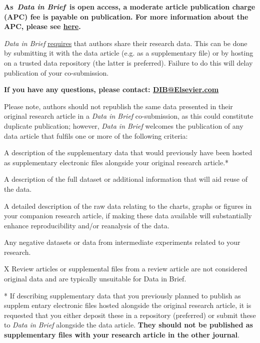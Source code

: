 \documentclass[times,final]{elsarticle.cls}
\begin{document}
\vskip6pt\noindent
\textbf{As~\textit{Data in Brief}~is open access, a moderate article publication charge
(APC) fee is payable on publication. For more information about the
APC, please see 
\href{https://www.elsevier.com/journals/data-in-brief/2352-3409/open-access-journal}%
{here}.}

\vskip6pt\noindent
\textit{Data in Brief} \underline{requires} that authors share their research data. This can
be done by submitting it with the data article (e.g. as a supplementary
file) or by hosting on a trusted data repository (the latter is
preferred). Failure to do this will delay publication of your
co-submission.

\vskip6pt\noindent
\textbf{If you have any questions, please contact: 
\href{mailto:DIB@Elsevier.com}{DIB@Elsevier.com}}

\vskip6pt\noindent
Please note, authors should not republish the same data presented in
their original research article in a \textit{Data in Brief} co-submission, as
this could constitute duplicate publication; however, \textit{Data in Brief}
welcomes the publication of any data article that fulfils one or more
of the following criteria:

\checkmark A description of the supplementary data that would
previously have been hosted as supplementary electronic files alongside
your original research article.*

\checkmark A description of the full dataset or additional information
that will aid reuse of the data.

\checkmark A detailed description of the raw data relating to the
charts, graphs or figures in your companion research article, if making
these data available will substantially enhance reproducibility and/or
reanalysis of the data.

\checkmark Any negative datasets or data from intermediate experiments
related to your research. 

\textsf{X} Review articles or supplemental files from a review article
are not considered original data and are typically unsuitable for Data
in Brief. 

\vskip12pt\noindent
* If describing supplementary data that you previously planned to
publish as supplem
entary electronic files hosted alongside the original
research article, it is requested that you either\break 
deposit these in a
repository (preferred) or submit these to \textit{Data in Brief} alongside the
data article. \textbf{They should not be published as supplementary files with
your research article in the other journal}.
\end{document}
